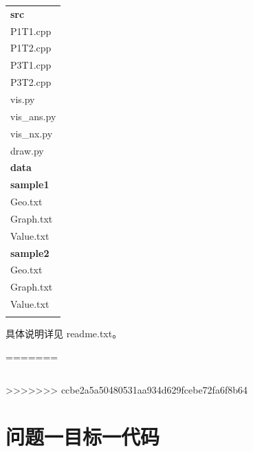 \documentclass{cumcmthesis}
\begin{document}
\begin{appendices}
\begin{table}[htbp]
\begin{small}
\begin{tabular}{l}
        \hspace{2em}\textbf{src}\\
        \hspace{4em}P1T1.cpp\\
        \hspace{4em}P1T2.cpp\\
        \hspace{4em}P3T1.cpp\\
        \hspace{4em}P3T2.cpp\\
        \hspace{4em}vis.py\\
        \hspace{4em}vis\_ans.py\\
        \hspace{4em}vis\_nx.py\\
        \hspace{4em}draw.py\\
        \hspace{2em}\textbf{data}\\
        \hspace{4em}\textbf{sample1}\\
        \hspace{6em}Geo.txt\\
        \hspace{6em}Graph.txt\\
        \hspace{6em}Value.txt\\
        \hspace{4em}\textbf{sample2}\\
        \hspace{6em}Geo.txt\\
        \hspace{6em}Graph.txt\\
        \hspace{6em}Value.txt\\
        \Xhline{2pt}
    \end{tabular}
    \end{small}
\end{table}

具体说明详见 readme.txt。


=======
\begin{tabular}{cc}
     
      
\end{tabular}

>>>>>>> ccbe2a5a50480531aa934d629fcebe72fa6f8b64
\section{问题一目标一代码}


\end{appendices}
\end{document}
